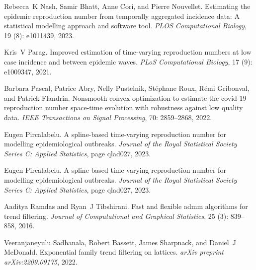 \documentclass[10pt,letterpaper]{article}
\begin{document}
\begin{thebibliography}{23}
  Rebecca~K Nash, Samir Bhatt, Anne Cori, and Pierre Nouvellet.
  \newblock Estimating the epidemic reproduction number from temporally
    aggregated incidence data: A statistical modelling approach and software
    tool.
  \newblock \emph{PLOS Computational Biology}, 19 (8):
    e1011439, 2023.
  
  Kris~V Parag.
  \newblock Improved estimation of time-varying reproduction numbers at low case
    incidence and between epidemic waves.
  \newblock \emph{PLoS Computational Biology}, 17 (9):
    e1009347, 2021.
  
  Barbara Pascal, Patrice Abry, Nelly Pustelnik, St{\'e}phane Roux, R{\'e}mi
    Gribonval, and Patrick Flandrin.
  \newblock Nonsmooth convex optimization to estimate the covid-19 reproduction
    number space-time evolution with robustness against low quality data.
  \newblock \emph{IEEE Transactions on Signal Processing}, 70:
    2859--2868, 2022.
  
  Eugen Pircalabelu.
  \newblock A spline-based time-varying reproduction number for modelling
    epidemiological outbreaks.
  \newblock \emph{Journal of the Royal Statistical Society Series C: Applied
    Statistics}, page qlad027, 2023{}.
  
  Eugen Pircalabelu.
  \newblock A spline-based time-varying reproduction number for modelling
    epidemiological outbreaks.
  \newblock \emph{Journal of the Royal Statistical Society Series C: Applied
    Statistics}, page qlad027, 2023{}.
  
  Aaditya Ramdas and Ryan~J Tibshirani.
  \newblock Fast and flexible admm algorithms for trend filtering.
  \newblock \emph{Journal of Computational and Graphical Statistics}, 25
    (3): 839--858, 2016.
  
  Veeranjaneyulu Sadhanala, Robert Bassett, James Sharpnack, and Daniel~J
    McDonald.
  \newblock Exponential family trend filtering on lattices.
  \newblock \emph{arXiv preprint arXiv:2209.09175}, 2022.
  

\end{thebibliography}
\end{document}
